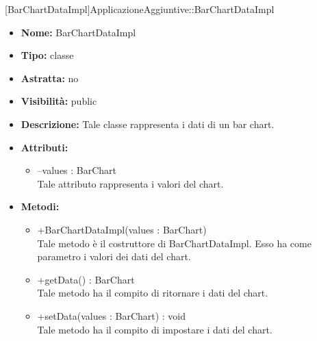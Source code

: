 
			[BarChartDataImpl]{ApplicazioneAggiuntive::BarChartDataImpl}
			

	
			
			\begin{itemize}
			\item \textbf{Nome:} BarChartDataImpl
			\item \textbf{Tipo:} classe
			
		\item \textbf{Astratta:}
		no
			\item \textbf{Visibilità:} public
			\item \textbf{Descrizione:} Tale classe rappresenta i dati di un bar chart.
			\item \textbf{Attributi:}
				\begin{itemize}
				\setlength{\itemsep}{5pt}
				
					\item[\ding{111}] {--values : BarChart} \\ [1mm] Tale attributo rappresenta i valori del chart.
				\end{itemize}
		
			\item \textbf{Metodi:}
				\begin{itemize}
				\setlength{\itemsep}{5pt}
				
					\item[\ding{111}] {{+BarChartDataImpl(values : BarChart)}} \\ [1mm] Tale metodo è il costruttore di BarChartDataImpl. Esso ha come parametro i valori dei dati del chart.
					\item[\ding{111}] {{+getData() : BarChart}} \\ [1mm] Tale metodo ha il compito di ritornare i dati del chart.
					\item[\ding{111}] {{+setData(values : BarChart) : void}} \\ [1mm] Tale metodo ha il compito di impostare i dati del chart.
				\end{itemize}
		
			\end{itemize}
	
